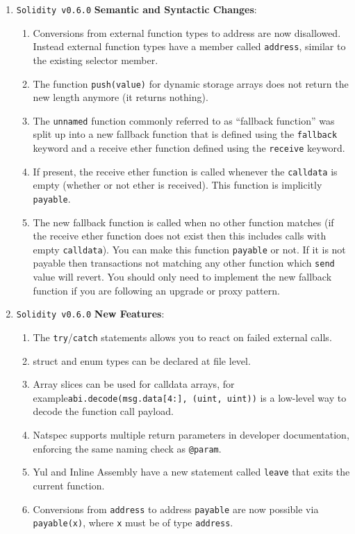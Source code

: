 \begin{enumerate}
\item \verb|Solidity v0.6.0| \textbf{Semantic and Syntactic Changes}:
    \begin{enumerate}
	\item Conversions from external function types to address are now disallowed. Instead external function types have a member called \verb|address|, similar to the existing selector member.
	\item The function \verb|push(value)| for dynamic storage arrays does not return the new length anymore (it returns nothing).
	\item The \verb|unnamed| function commonly referred to as “fallback function” was split up into a new fallback function that is defined using the \verb|fallback| keyword and a receive ether function defined using the \verb|receive| keyword.
	\item If present, the receive ether function is called whenever the \verb|calldata| is empty (whether or not ether is received). This function is implicitly \verb|payable|.
	\item The new fallback function is called when no other function matches (if the receive ether function does not exist then this includes calls with empty \verb|calldata|). You can make this function \verb|payable| or not. If it is not payable then transactions not matching any other function which \verb|send| value will revert. You should only need to implement the new fallback function if you are following an upgrade or proxy pattern.
    \end{enumerate}

\item \verb|Solidity v0.6.0| \textbf{New Features}:
    \begin{enumerate}
	\item The \verb|try|/\verb|catch| statements allows you to react on failed external calls.
	\item struct and enum types can be declared at file level.
	\item Array slices can be used for calldata arrays, for example\linebreak\verb|abi.decode(msg.data[4:], (uint, uint))| is a low-level way to decode the function call payload.
	\item Natspec supports multiple return parameters in developer documentation, enforcing the same naming check as \verb|@param|.
	\item Yul and Inline Assembly have a new statement called \verb|leave| that exits the current function.
	\item Conversions from \verb|address| to address \verb|payable| are now possible via \verb|payable(x)|, where \verb|x| must be of type \verb|address|.
    \end{enumerate}


\end{enumerate}
